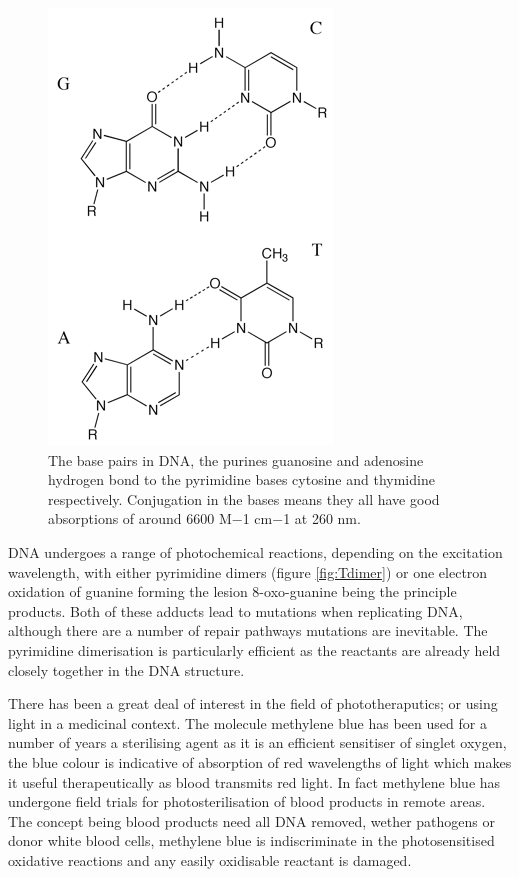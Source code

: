 \documentclass[
]{book}
\begin{document}
\begin{figure}

{\centering \includegraphics[width=0.5\linewidth]{images/DNAbases} 

}

\caption{The base pairs in DNA, the purines guanosine and adenosine hydrogen bond to the pyrimidine bases cytosine and thymidine respectively. Conjugation in the bases means they all have good absorptions of around 6600 M−1 cm−1 at 260 nm.}\label{fig:DNAbases}
\end{figure}

DNA undergoes a range of photochemical reactions, depending on the excitation wavelength, with either pyrimidine dimers (figure \ref{fig:Tdimer}) or one electron oxidation of guanine forming the lesion 8-oxo-guanine being the principle products. Both of these adducts lead to mutations when replicating DNA, although there are a number of repair pathways mutations are inevitable. The pyrimidine dimerisation is particularly efficient as the reactants are already held closely together in the DNA structure.

There has been a great deal of interest in the field of phototheraputics; or using light in a medicinal context. The molecule methylene blue has been used for a number of years a sterilising agent as it is an efficient sensitiser of singlet oxygen, the blue colour is indicative of absorption of red wavelengths of light which makes it useful therapeutically as blood transmits red light. In fact methylene blue has undergone field trials for photosterilisation of blood products in remote areas. The concept being blood products need all DNA removed, wether pathogens or donor white blood cells, methylene blue is indiscriminate in the photosensitised oxidative reactions and any easily oxidisable reactant is damaged.
\end{document}
